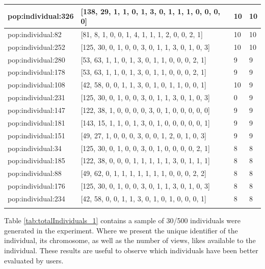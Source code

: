 \begin{table}
\begin{tabular}{p{3cm} p{4cm} p{3cm} p{3cm}}
\small{pop:individual:326} & \small{[138, 29, 1, 1, 0, 1, 3, 0, 1, 1, 1, 0, 0, 0, 0]}
& \small{10} & \small{10}\\ \hline
\small{pop:individual:82} & \small{[81, 8, 1, 0, 0, 1, 4, 1, 1, 1, 2, 0, 0, 2, 1]}
& \small{10} & \small{10}\\ \hline
\small{pop:individual:252} & \small{[125, 30, 0, 1, 0, 0, 3, 0, 1, 1, 3, 0, 1, 0, 3]}
& \small{10} & \small{10}\\ \hline
\small{pop:individual:280} & \small{[53, 63, 1, 1, 0, 1, 3, 0, 1, 1, 0, 0, 0, 2, 1]}
& \small{9} & \small{9}\\ \hline
\small{pop:individual:178} & \small{[53, 63, 1, 1, 0, 1, 3, 0, 1, 1, 0, 0, 0, 2, 1]}
& \small{9} & \small{9}\\ \hline
\small{pop:individual:108} & \small{[42, 58, 0, 0, 1, 1, 3, 0, 1, 0, 1, 1, 0, 0, 1]}
& \small{10} & \small{9}\\ \hline
\small{pop:individual:231} & \small{[125, 30, 0, 1, 0, 0, 3, 0, 1, 1, 3, 0, 1, 0, 3]}
& \small{0} & \small{9}\\ \hline
\small{pop:individual:147} & \small{[122, 38, 1, 0, 0, 0, 0, 3, 0, 1, 0, 0, 0, 0, 0]}
& \small{9} & \small{9}\\ \hline
\small{pop:individual:181} & \small{[143, 15, 1, 1, 0, 1, 3, 0, 1, 0, 0, 0, 0, 0, 1]}
& \small{9} & \small{9}\\ \hline
\small{pop:individual:151} & \small{[49, 27, 1, 0, 0, 0, 3, 0, 0, 1, 2, 0, 1, 0, 3]}
& \small{9} & \small{9}\\ \hline
\small{pop:individual:34} & \small{[125, 30, 0, 1, 0, 0, 3, 0, 1, 0, 0, 0, 0, 2, 1]}
& \small{8} & \small{8}\\ \hline
\small{pop:individual:185} & \small{[122, 38, 0, 0, 0, 1, 1, 1, 1, 1, 3, 0, 1, 1, 1]}
& \small{8} & \small{8}\\ \hline
\small{pop:individual:88} & \small{[49, 62, 0, 1, 1, 1, 1, 1, 1, 1, 0, 0, 0, 2, 2]}
& \small{8} & \small{8}\\ \hline
\small{pop:individual:176} & \small{[125, 30, 0, 1, 0, 0, 3, 0, 1, 1, 3, 0, 1, 0, 3]}
& \small{8} & \small{8}\\ \hline
\small{pop:individual:234} & \small{[42, 58, 0, 0, 1, 1, 3, 0, 1, 0, 1, 0, 0, 0, 1]}
& \small{8} & \small{8}\\ \hline
\noalign{\smallskip}\hline
\end{tabular}
\end{table}

Table \ref{tab:totalIndividuals_1} contains a sample of 30/500 individuals were
generated in the experiment. Where we present the unique identifier of the
individual, its chromosome, as well as the number of views, likes available to
the individual. These results are useful to observe which individuals have been better
evaluated by users.

